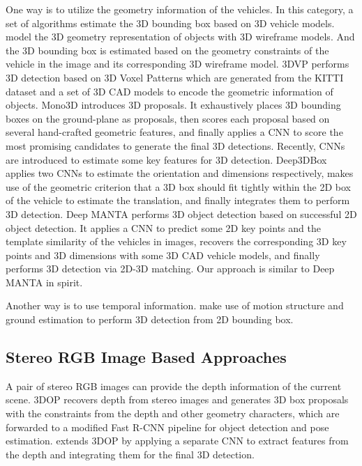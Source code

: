 \documentclass[a4paper,12pt]{article}
\begin{document}
One way is to utilize the geometry information of the vehicles. In this category, a set of algorithms estimate the 3D bounding box based on 3D vehicle models. \cite{834, 741} model the 3D geometry representation of objects with 3D wireframe models. And the 3D bounding box is estimated based on the geometry constraints of the vehicle in the image and its corresponding 3D wireframe model. 3DVP \cite{xiang2015data} performs 3D detection based on 3D Voxel Patterns which are generated from the KITTI dataset \cite{Geiger2012CVPR} and a set of 3D CAD models to encode the geometric information of objects. Mono3D \cite{cvpr16chen} introduces 3D proposals. It exhaustively places 3D bounding boxes on the ground-plane as proposals, then scores each proposal based on several hand-crafted geometric features, and finally applies a CNN to score the most promising candidates to generate the final 3D detections. Recently, CNNs are introduced to estimate some key features for 3D detection. Deep3DBox \cite{DBLP:journals/corr/MousavianAFK16} applies two CNNs to estimate the orientation and dimensions respectively, makes use of the geometric criterion that a 3D box should fit tightly within the 2D box of the vehicle to estimate the translation, and finally integrates them to perform 3D detection. Deep MANTA \cite{DBLP:journals/corr/ChabotCRTC17} performs 3D object detection based on successful 2D object detection. It applies a CNN to predict some 2D key points and the template similarity of the vehicles in images, recovers the corresponding 3D key points and 3D dimensions with some 3D CAD vehicle models, and finally performs 3D detection via 2D-3D matching. Our approach is similar to Deep MANTA in spirit.

Another way is to use temporal information. \cite{7780838, 7298997} make use of motion structure and ground estimation to perform 3D detection from 2D bounding box.



\subsection{Stereo RGB Image Based Approaches}
A pair of stereo RGB images can provide the depth information of the current scene. 3DOP \cite{DBLP:journals/corr/ChenKZMFU16} recovers depth from stereo images and generates 3D box proposals with the constraints from the depth and other geometry characters, which are forwarded to a modified Fast R-CNN \cite{DBLP:journals/corr/Girshick15} pipeline for object detection and pose estimation. \cite{PHAM2017110} extends 3DOP by applying a separate CNN to extract features from the depth and integrating them for the final 3D detection.
\end{document}
